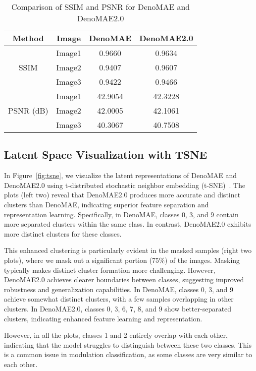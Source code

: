 \begin{table}[htbp]
    \centering
    \caption{Comparison of SSIM and PSNR for DenoMAE and DenoMAE2.0}
    \renewcommand{\arraystretch}{1.2}
    \begin{tabular}{|c|c|c|c|}
        \hline
        Method & Image & DenoMAE & DenoMAE2.0 \\ \hline
        \multirow{3}{*}{SSIM} 
        & Image1 & 0.9660 & 0.9634 \\ 
        & Image2 & 0.9407 & 0.9607 \\ 
        & Image3 & 0.9422 & 0.9466 \\ \hline
        \multirow{3}{*}{PSNR (dB)} 
        & Image1 &  42.9054 & 42.3228 \\ 
        & Image2 & 42.0005 & 42.1061 \\ 
        & Image3 & 40.3067 & 40.7508 \\ \hline
    \end{tabular}
    \label{tab:ssim_psnr_comparison}
\end{table}

\subsection{Latent Space Visualization with TSNE}

In Figure~\ref{fig:tsne}, we visualize the latent representations of DenoMAE and DenoMAE2.0 using t-distributed stochastic neighbor embedding (t-SNE)~\cite{van2008visualizing}. The plots (left two) reveal that DenoMAE2.0 produces more accurate and distinct clusters than DenoMAE, indicating superior feature separation and representation learning. Specifically, in DenoMAE, classes 0, 3, and 9 contain more separated clusters within the same class. In contrast, DenoMAE2.0 exhibits more distinct clusters for these classes.

This enhanced clustering is particularly evident in the masked samples (right two plots), where we mask out a significant portion (75\%) of the images. Masking typically makes distinct cluster formation more challenging. However, DenoMAE2.0 achieves clearer boundaries between classes, suggesting improved robustness and generalization capabilities. In DenoMAE, classes 0, 3, and 9 achieve somewhat distinct clusters, with a few samples overlapping in other clusters. In DenoMAE2.0, classes 0, 3, 6, 7, 8, and 9 show better-separated clusters, indicating enhanced feature learning and representation.

However, in all the plots, classes 1 and 2 entirely overlap with each other, indicating that the model struggles to distinguish between these two classes. This is a common issue in modulation classification, as some classes are very similar to each other.

